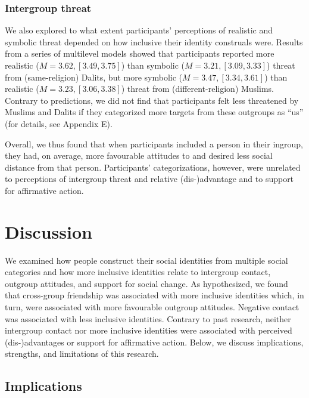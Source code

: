 \documentclass[12pt, a4paper]{article}
\begin{document}
\subsubsection{Intergroup threat}

We also explored to what extent participants’ perceptions of realistic and symbolic threat depended on how inclusive their identity construals were. Results from a series of multilevel models showed that participants reported more realistic ($M = 3.62, [3.49, 3.75]$) than symbolic ($M = 3.21, [3.09, 3.33]$) threat from (same-religion) Dalits, but more symbolic ($M = 3.47, [3.34, 3.61]$) than realistic ($M = 3.23, [3.06, 3.38]$) threat from (different-religion) Muslims. Contrary to predictions, we did not find that participants felt less threatened by Muslims and Dalits if they categorized more targets from these outgroups as “us” (for details, see Appendix E).

Overall, we thus found that when participants included a person in their ingroup, they had, on average, more favourable attitudes to and desired less social distance from that person. Participants’ categorizations, however, were unrelated to perceptions of intergroup threat and relative (dis-)advantage and to support for affirmative action.

\section{Discussion}

We examined how people construct their social identities from multiple social categories and how more inclusive identities relate to intergroup contact, outgroup attitudes, and support for social change. As hypothesized, we found that cross-group friendship was associated with more inclusive identities which, in turn, were associated with more favourable outgroup attitudes. Negative contact was associated with less inclusive identities. Contrary to past research, neither intergroup contact nor more inclusive identities were associated with perceived (dis-)advantages or support for affirmative action. Below, we discuss implications, strengths, and limitations of this research.

\subsection{Implications}
\end{document}
